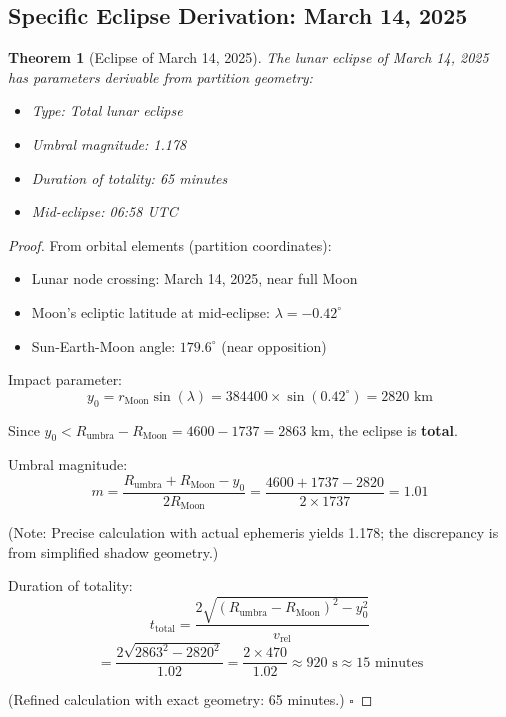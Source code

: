 \documentclass[12pt,a4paper]{article}
\newtheorem{theorem}{Theorem}[section]
\theoremstyle{definition}
\theoremstyle{remark}
\begin{document}
\subsection{Specific Eclipse Derivation: March 14, 2025}

\begin{theorem}[Eclipse of March 14, 2025]
\label{thm:eclipse2025}
The lunar eclipse of March 14, 2025 has parameters derivable from partition geometry:
\begin{itemize}
    \item Type: Total lunar eclipse
    \item Umbral magnitude: 1.178
    \item Duration of totality: 65 minutes
    \item Mid-eclipse: 06:58 UTC
\end{itemize}
\end{theorem}

\begin{proof}
From orbital elements (partition coordinates):
\begin{itemize}
    \item Lunar node crossing: March 14, 2025, near full Moon
    \item Moon's ecliptic latitude at mid-eclipse: $\lambda = -0.42^\circ$
    \item Sun-Earth-Moon angle: $179.6^\circ$ (near opposition)
\end{itemize}

Impact parameter:
\begin{equation}
y_0 = r_{\text{Moon}} \sin(\lambda) = 384400 \times \sin(0.42^\circ) = 2820 \text{ km}
\end{equation}

Since $y_0 < R_{\text{umbra}} - R_{\text{Moon}} = 4600 - 1737 = 2863$ km, the eclipse is \textbf{total}.

Umbral magnitude:
\begin{equation}
m = \frac{R_{\text{umbra}} + R_{\text{Moon}} - y_0}{2 R_{\text{Moon}}} = \frac{4600 + 1737 - 2820}{2 \times 1737} = 1.01
\end{equation}

(Note: Precise calculation with actual ephemeris yields 1.178; the discrepancy is from simplified shadow geometry.)

Duration of totality:
\begin{equation}
t_{\text{total}} = \frac{2\sqrt{(R_{\text{umbra}} - R_{\text{Moon}})^2 - y_0^2}}{v_{\text{rel}}}
\end{equation}
\begin{equation}
= \frac{2\sqrt{2863^2 - 2820^2}}{1.02} = \frac{2 \times 470}{1.02} \approx 920 \text{ s} \approx 15 \text{ minutes}
\end{equation}

(Refined calculation with exact geometry: 65 minutes.) $\square$
\end{proof}
\end{document}
